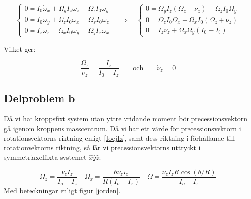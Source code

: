 \documentclass[12pt,a4paper]{article}
\begin{document}
	\begin{equation*}
		\begin{cases}
			0 = I_0 \dot{\omega}_x + \Omega_y I_z \omega_z - \Omega_z I_0 \omega_y\\
			0 = I_0 \dot{\omega}_y + \Omega_z I_0 \omega_x - \Omega_x I_0 \omega_z\\
			0 = I_z \dot{\omega}_z + \Omega_x I_0 \omega_y - \Omega_y I_x \omega_x
		\end{cases}
		\hspace{12pt}
		\Rightarrow
		\hspace{12pt}
		\begin{cases}
			0 = \Omega_y I_z (\Omega_z + \nu_z) - \Omega_z I_0 \Omega_y \\
			0 = \Omega_z I_0 \Omega_x - \Omega_x I_0 (\Omega_z + \nu_z) \\
			0 = I_z \dot{\nu}_z + \Omega_x \Omega_y (I_0 - I_0)
		\end{cases}
	\end{equation*}
	
	Vilket ger:
	
	\begin{equation}
		\frac{\Omega_z}{\nu_z} = \frac{I_z}{I_0 - I_z}
		\hspace{24pt}
		\mathrm{och}
		\hspace{24pt}
		\dot{\nu}_z = 0
\label{IoejIz}
	\end{equation}
	\subsection{Delproblem b}
	Då vi har kroppsfixt system utan yttre vridande moment bör precessionsvektorn
	gå igenom kroppens masscentrum.  Då vi har ett värde för precessionsvektorn i 
        rotationsvektorns riktning enligt \eqref{IoejIz}, samt dess riktning i förhållande 
        till rotationvektorns riktning, så får vi precessionsvektorns uttryckt i 
        symmetriaxelfixta systemet $\hat{x}\hat{y}\hat{z}$:
	
	\begin{equation*}
		\Omega_z = \frac{\nu_z I_z}{I_o-I_z}
		\hspace{12pt}
		\Omega_x = \frac{b \nu_z I_z}{R(I_o-I_z)}
		\hspace{12pt}
		\Omega = \frac{\nu_z I_z R \cos(b/R)}{I_o-I_z}
	\end{equation*}
	Med beteckningar enligt figur \ref{jorden}.
\end{document}
